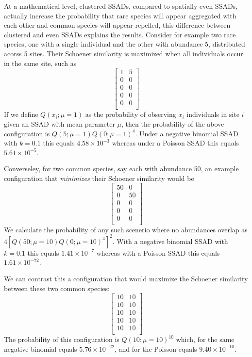 \documentclass[]{article}
\begin{document}
At a mathematical level, clustered SSADs, compared to spatially even
SSADs, actually increase the probability that rare species will appear
aggregated with each other and common species will appear repelled, this
difference between clustered and even SSADs explains the results.
Consider for example two rare species, one with a single individual and
the other with abundance 5, distributed acorss 5 sites. Their Schoener
similarity is maximized when all individuals occur in the same site,
such as \[
\begin{bmatrix} 1 & 5 \\ 0 & 0 \\ 0 & 0 \\ 0 & 0 \\ 0 & 0 \\ \end{bmatrix}
\] If we define \(Q(x_i; \mu = 1)\) as the probability of observing
\(x_i\) individuals in site \(i\) given an SSAD with mean parameter
\(\mu\), then the probability of the above configuration is
\(Q(5; \mu = 1) Q(0; \mu = 1)^4\). Under a negative binomial SSAD with
\(k = 0.1\) this equals \(4.58 \times 10^{-3}\) whereas under a Poisson
SSAD this equals \(5.61 \times 10^{-5}\).

Converseley, for two common species, say each with abundance 50, an
example configuration that \emph{minimizes} their Schoener similarity
would be \[
\begin{bmatrix} 50 & 0 \\ 0 & 50 \\ 0 & 0 \\ 0 & 0 \\ 0 & 0 \\ \end{bmatrix}
\] We calculate the probability of any such scenerio where no abundances
overlap as \(4 [Q(50; \mu = 10) Q(0; \mu = 10)^{4}]^2\). With a negative
binomial SSAD with \(k = 0.1\) this equals \(1.41 \times 10^{-7}\)
whereas with a Poisson SSAD this equals \(1.61 \times 10^{-72}\).

We can contrast this a configuration that would maximize the Schoener
similarity between these two common species: \[
\begin{bmatrix} 10 & 10 \\ 10 & 10 \\ 10 & 10 \\ 10 & 10 \\ 10 & 10 \\ \end{bmatrix}
\] The probability of this configuration is \(Q(10; \mu = 10)^{10}\)
which, for the same negative binomial equals \(5.76 \times 10^{-22}\),
and for the Poisson equals \(9.40 \times 10^{-10}\).
\end{document}
